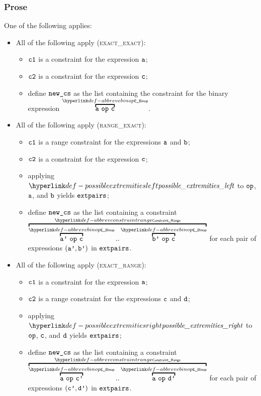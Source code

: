 \subsubsection{Prose}
One of the following applies:
\begin{itemize}
  \item All of the following apply (\textsc{exact\_exact}):
  \begin{itemize}
    \item $\texttt{c1}$ is a constraint for the expression $\texttt{a}$;
    \item $\texttt{c2}$ is a constraint for the expression $\texttt{c}$;
    \item define $\texttt{new\_cs}$ as the list containing the constraint for the binary expression $\AbbrevEBinop{\op}{\va}{\vc}$.
  \end{itemize}

  \item All of the following apply (\textsc{range\_exact}):
  \begin{itemize}
    \item $\texttt{c1}$ is a range constraint for the expressions $\texttt{a}$ and $\texttt{b}$;
    \item $\texttt{c2}$ is a constraint for the expression $\texttt{c}$;
    \item applying $\possibleextremitiesleft$ to $\texttt{op}$, $\texttt{a}$, and $\texttt{b}$ yields $\texttt{extpairs}$;
    \item define $\texttt{new\_cs}$ as the list containing a constraint $\AbbrevConstraintRange{\AbbrevEBinop{\op}{\vap}{\vc}}{\AbbrevEBinop{\op}{\vbp}{\vc}}$
          for each pair of expressions $(\texttt{a'}, \texttt{b'})$ in $\texttt{extpairs}$.
  \end{itemize}

  \item All of the following apply (\textsc{exact\_range}):
  \begin{itemize}
    \item $\texttt{c1}$ is a constraint for the expression $\texttt{a}$;
    \item $\texttt{c2}$ is a range constraint for the expressions $\texttt{c}$ and $\texttt{d}$;
    \item applying $\possibleextremitiesright$ to $\texttt{op}$, $\texttt{c}$, and $\texttt{d}$ yields $\texttt{extpairs}$;
    \item define $\texttt{new\_cs}$ as the list containing a constraint $\AbbrevConstraintRange{\AbbrevEBinop{\op}{\va}{\vcp}}{\AbbrevEBinop{\op}{\va}{\vdp}}$
          for each pair of expressions $(\texttt{c'}, \texttt{d'})$ in $\texttt{extpairs}$.
  \end{itemize}


\end{itemize}
